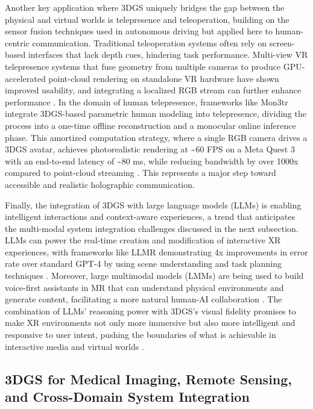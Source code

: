 \documentclass[11pt]{article}
\begin{document}
Another key application where 3DGS uniquely bridges the gap between the physical and virtual worlds is telepresence and teleoperation, building on the sensor fusion techniques used in autonomous driving but applied here to human-centric communication. Traditional teleoperation systems often rely on screen-based interfaces that lack depth cues, hindering task performance. Multi-view VR telepresence systems that fuse geometry from multiple cameras to produce GPU-accelerated point-cloud rendering on standalone VR hardware have shown improved usability, and integrating a localized RGB stream can further enhance performance \cite{ref684}. In the domain of human telepresence, frameworks like Mon3tr integrate 3DGS-based parametric human modeling into telepresence, dividing the process into a one-time offline reconstruction and a monocular online inference phase. This amortized computation strategy, where a single RGB camera drives a 3DGS avatar, achieves photorealistic rendering at \textasciitilde60 FPS on a Meta Quest 3 with an end-to-end latency of \textasciitilde80 ms, while reducing bandwidth by over 1000x compared to point-cloud streaming \cite{ref685}. This represents a major step toward accessible and realistic holographic communication.

Finally, the integration of 3DGS with large language models (LLMs) is enabling intelligent interactions and context-aware experiences, a trend that anticipates the multi-modal system integration challenges discussed in the next subsection. LLMs can power the real-time creation and modification of interactive XR experiences, with frameworks like LLMR demonstrating 4x improvements in error rate over standard GPT-4 by using scene understanding and task planning techniques \cite{ref686}. Moreover, large multimodal models (LMMs) are being used to build voice-first assistants in MR that can understand physical environments and generate content, facilitating a more natural human-AI collaboration \cite{ref687}. The combination of LLMs' reasoning power with 3DGS's visual fidelity promises to make XR environments not only more immersive but also more intelligent and responsive to user intent, pushing the boundaries of what is achievable in interactive media and virtual worlds \cite{ref688}.

\subsection{3DGS for Medical Imaging, Remote Sensing, and Cross-Domain System Integration}
\end{document}
